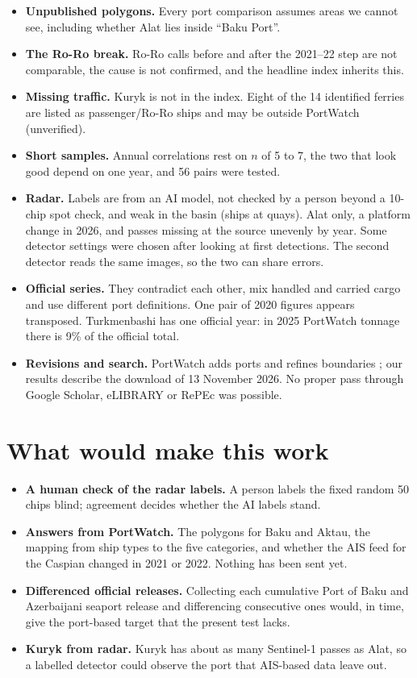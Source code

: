 \documentclass[11pt,a4paper]{article}
\begin{document}
\begin{itemize}
\item \textbf{Unpublished polygons.} Every port comparison assumes areas we cannot see, including whether Alat lies inside ``Baku Port''.
\item \textbf{The Ro-Ro break.} Ro-Ro calls before and after the 2021--22 step are not comparable, the cause is not confirmed, and the headline index inherits this.
\item \textbf{Missing traffic.} Kuryk is not in the index. Eight of the 14 identified ferries are listed as passenger/Ro-Ro ships and may be outside PortWatch (unverified).
\item \textbf{Short samples.} Annual correlations rest on $n$ of 5 to 7, the two that look good depend on one year, and 56 pairs were tested.
\item \textbf{Radar.} Labels are from an AI model, not checked by a person beyond a 10-chip spot check, and weak in the basin (ships at quays). Alat only, a platform change in 2026, and passes missing at the source unevenly by year. Some detector settings were chosen after looking at first detections. The second detector reads the same images, so the two can share errors.
\item \textbf{Official series.} They contradict each other, mix handled and carried cargo and use different port definitions. One pair of 2020 figures appears transposed. Turkmenbashi has one official year: in 2025 PortWatch tonnage there is 9\% of the official total.
\item \textbf{Revisions and search.} PortWatch adds ports and refines boundaries \cite{arslanalp2026nowcasting}; our results describe the download of 13 November 2026. No proper pass through Google Scholar, eLIBRARY or RePEc was possible.
\end{itemize}

\section{What would make this work}
\label{sec:next}

\begin{itemize}
\item \textbf{A human check of the radar labels.} A person labels the fixed random 50 chips blind; agreement decides whether the AI labels stand.
\item \textbf{Answers from PortWatch.} The polygons for Baku and Aktau, the mapping from ship types to the five categories, and whether the AIS feed for the Caspian changed in 2021 or 2022. Nothing has been sent yet.
\item \textbf{Differenced official releases.} Collecting each cumulative Port of Baku and Azerbaijani seaport release and differencing consecutive ones would, in time, give the port-based target that the present test lacks.
\item \textbf{Kuryk from radar.} Kuryk has about as many Sentinel-1 passes as Alat, so a labelled detector could observe the port that AIS-based data leave out.
\end{itemize}
\end{document}
